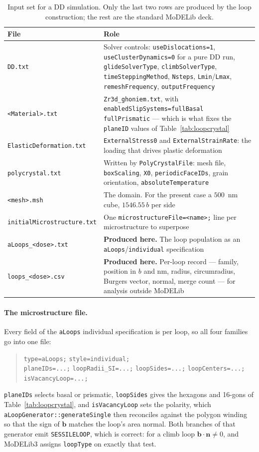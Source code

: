 \documentclass[11pt,a4paper]{article}
\newcommand{\code}[1]{\texttt{\small #1}}
\begin{document}
\begin{table}[htb]
\centering
\caption{Input set for a DD simulation. Only the last two rows are produced by
the loop construction; the rest are the standard MoDELib deck.}
\label{tab:ddinputs}
\small
\begin{tabular}{p{4.6cm}p{10.2cm}}
\toprule
File & Role \\
\midrule
\code{DD.txt} &
Solver controls: \code{useDislocations=1}, \code{useClusterDynamics=0} for a
pure DD run, \code{glideSolverType}, \code{climbSolverType},
\code{timeSteppingMethod}, \code{Nsteps}, \code{Lmin}/\code{Lmax},
\code{remeshFrequency}, \code{outputFrequency} \\
\code{<Material>.txt} &
\code{Zr3d\_ghoniem.txt}, with
\code{enabledSlipSystems=fullBasal fullPrismatic} --- which is what fixes the
\code{planeID} values of Table~\ref{tab:loopcrystal} \\
\code{ElasticDeformation.txt} &
\code{ExternalStress0} and \code{ExternalStrainRate}: the loading that drives
plastic deformation \\
\code{polycrystal.txt} &
Written by \code{PolyCrystalFile}: mesh file, \code{boxScaling},
\code{X0}, \code{periodicFaceIDs}, grain orientation,
\code{absoluteTemperature} \\
\code{<mesh>.msh} &
The domain. For the present case a $500$~nm cube, $1546.55\,b$ per side \\
\code{initialMicrostructure.txt} &
One \code{microstructureFile=<name>;} line per microstructure to superpose \\
\midrule
\code{aLoops\_<dose>.txt} &
\textbf{Produced here.} The loop population as an \code{aLoops}/\code{individual}
specification \\
\code{loops\_<dose>.csv} &
\textbf{Produced here.} Per-loop record --- family, position in $b$ and nm,
radius, circumradius, Burgers vector, normal, merge count --- for analysis
outside MoDELib \\
\bottomrule
\end{tabular}
\end{table}

\paragraph{The microstructure file.} Every field of the \code{aLoops}
individual specification is per loop, so all four families go into one file:
\begin{quote}\small
\code{type=aLoops;} \quad \code{style=individual;} \\
\code{planeIDs=...;} \quad \code{loopRadii\_SI=...;} \quad
\code{loopSides=...;} \quad \code{loopCenters=...;} \quad
\code{isVacancyLoop=...;}
\end{quote}
\code{planeIDs} selects basal or prismatic, \code{loopSides} gives the hexagons
and 16-gons of Table~\ref{tab:loopcrystal}, and \code{isVacancyLoop} sets the
polarity, which \code{aLoopGenerator::generateSingle} then reconciles against the
polygon winding so that the sign of $\mathbf{b}$ matches the loop's area normal.
Both branches of that generator emit \code{SESSILELOOP}, which is correct: for a
climb loop $\mathbf{b}\cdot\mathbf{n}\neq 0$, and MoDELib3 assigns
\code{loopType} on exactly that test.
\end{document}
